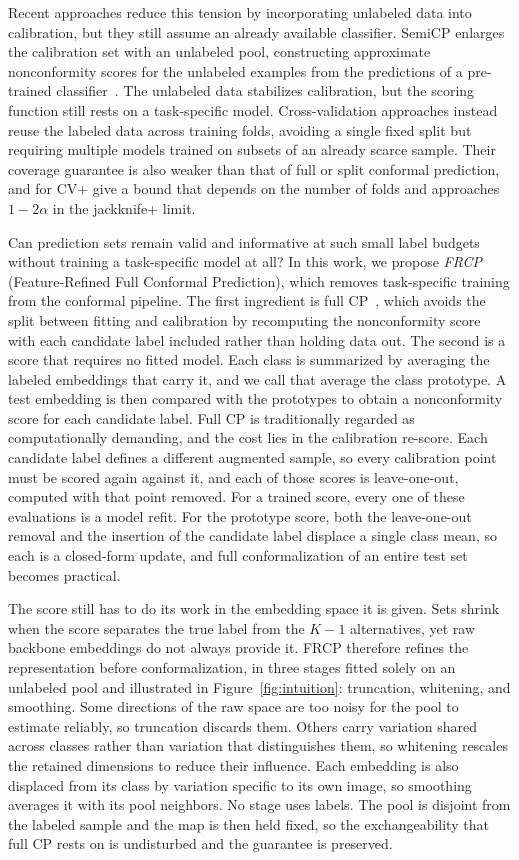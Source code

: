 Recent approaches reduce this tension by incorporating unlabeled data into calibration, but they still assume an already available classifier. SemiCP enlarges the calibration set with an unlabeled pool, constructing approximate nonconformity scores for the unlabeled examples from the predictions of a pre-trained classifier~\citep{zhou2026semicp}. The unlabeled data stabilizes calibration, but the scoring function still rests on a task-specific model. Cross-validation approaches instead reuse the labeled data across training folds, avoiding a single fixed split but requiring multiple models trained on subsets of an already scarce sample. Their coverage guarantee is also weaker than that of full or split conformal prediction, and for CV+ \citet{barber2021predictive} give a bound that depends on the number of folds and approaches $1 - 2\alpha$ in the jackknife+ limit.

 Can prediction sets remain valid and informative at such small label budgets without training a task-specific model at all? In this work, we propose \emph{FRCP} (Feature-Refined Full Conformal Prediction), which removes task-specific training from the conformal pipeline. The first ingredient is full CP~\citep{vovk2005algorithmic}, which avoids the split between fitting and calibration by recomputing the nonconformity score with each candidate label included rather than holding data out. The second is a score that requires no fitted model. Each class is summarized by averaging the labeled embeddings that carry it, and we call that average the class prototype. A test embedding is then compared with the prototypes to obtain a nonconformity score for each candidate label. Full CP is traditionally regarded as computationally demanding, and the cost lies in the calibration re-score. Each candidate label defines a different augmented sample, so every calibration point must be scored again against it, and each of those scores is leave-one-out, computed with that point removed. For a trained score, every one of these evaluations is a model refit. For the prototype score, both the leave-one-out removal and the insertion of the candidate label displace a single class mean, so each is a closed-form update, and full conformalization of an entire test set becomes practical.

The score still has to do its work in the embedding space it is given. Sets shrink when the score separates the true label from the $K-1$ alternatives, yet raw backbone embeddings do not always provide it. FRCP therefore refines the representation before conformalization, in three stages fitted solely on an unlabeled pool and illustrated in Figure~\ref{fig:intuition}: truncation, whitening, and smoothing. Some directions of the raw space are too noisy for the pool to estimate reliably, so truncation discards them. Others carry variation shared across classes rather than variation that distinguishes them, so whitening rescales the retained dimensions to reduce their influence. Each embedding is also displaced from its class by variation specific to its own image, so smoothing averages it with its pool neighbors. No stage uses labels. The pool is disjoint from the labeled sample and the map is then held fixed, so the exchangeability that full CP rests on is undisturbed and the guarantee is preserved.

